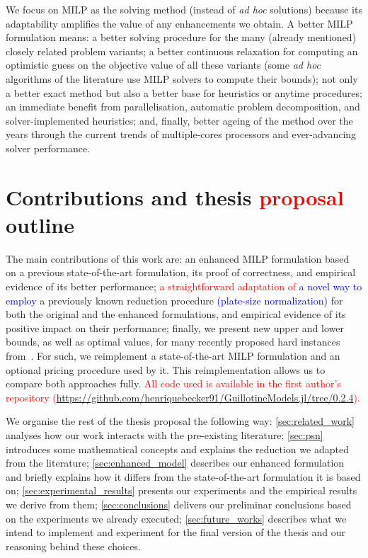 \documentclass[ppgc,tese,english,formais,babel]{iiufrgs}
\newif\iffinalversion
\newcommand{\newtext}[1]{\iffinalversion%
#1%
\else%
\textcolor{blue}{#1}%
\fi%
}
\newcommand{\oldtext}[1]{\iffinalversion%
\else%
\textcolor{red}{#1}%
\fi%
}
\begin{document}
We focus on MILP as the solving method (instead of \emph{ad hoc} solutions) because its adaptability amplifies the value of any enhancements we obtain.
A better MILP formulation means:
a better solving procedure for the many (already mentioned) closely related problem variants;
a better continuous relaxation for computing an optimistic guess on the objective value of all these variants (some \emph{ad hoc} algorithms of the literature use MILP solvers to compute their bounds);
not only a better exact method but also a better base for heuristics or anytime procedures;
an immediate benefit from parallelisation, automatic problem decomposition, and solver-implemented heuristics;
and, finally, better ageing of the method over the years through the current trends of multiple-cores processors and ever-advancing solver performance.

\section{Contributions and thesis \oldtext{proposal} outline}
\label{sec:contributions}

The main contributions of this work are:
an enhanced MILP formulation based on a previous state-of-the-art formulation, its proof of correctness, and empirical evidence of its better performance;
\oldtext{a straightforward adaptation of}\newtext{a novel way to employ} a previously known reduction procedure \newtext{(plate-size normalization)} for both the original and the enhanced formulations, and empirical evidence of its positive impact on their performance;
finally, we present new upper and lower bounds, as well as optimal values, for many recently proposed hard instances from~\citet{velasco:2019}.
For such, we reimplement a state-of-the-art MILP formulation and an optional pricing procedure used by it.
This reimplementation allows us to compare both approaches fully.
\oldtext{All code used is available in the first author's repository ({\small\url{https://github.com/henriquebecker91/GuillotineModels.jl/tree/0.2.4}}).}

We organise the rest of the thesis proposal the following way:
\cref{sec:related_work} analyses how our work interacts with the pre-existing literature;
\cref{sec:psn} introduces some mathematical concepts and explains the reduction we adapted from the literature;
\cref{sec:enhanced_model} describes our enhanced formulation and briefly explains how it differs from the state-of-the-art formulation it is based on;
\cref{sec:experimental_results} presents our experiments and the empirical results we derive from them;
\cref{sec:conclusions} delivers our preliminar conclusions based on the experiments we already executed;
\cref{sec:future_works} describes what we intend to implement and experiment for the final version of the thesis and our reasoning behind these choices.
\end{document}
